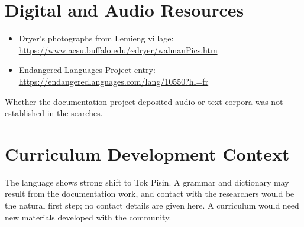 \documentclass[12pt]{article}
\begin{document}
\section{Digital and Audio Resources}
\begin{itemize}
\item Dryer's photographs from Lemieng village: \url{https://www.acsu.buffalo.edu/~dryer/walmanPics.htm}
\item Endangered Languages Project entry: \url{https://endangeredlanguages.com/lang/10550?hl=fr}
\end{itemize}
Whether the documentation project deposited audio or text corpora was not established in the searches.

\section{Curriculum Development Context}
The language shows strong shift to Tok Pisin. A grammar and dictionary may result from the documentation work, and contact with the researchers would be the natural first step; no contact details are given here. A curriculum would need new materials developed with the community.
\end{document}
